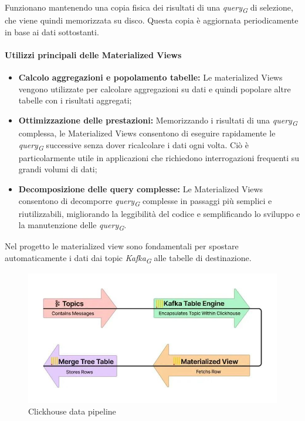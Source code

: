 Funzionano mantenendo una copia fisica dei risultati di una \textit{query}\textsubscript{\textit{G}} di selezione, che viene quindi memorizzata su disco. Questa copia è aggiornata periodicamente in base ai dati sottostanti.

\paragraph{Utilizzi principali delle Materialized Views}
\begin{itemize}
    \item \textbf{Calcolo aggregazioni e popolamento tabelle:} Le materialized Views vengono utilizzate per calcolare aggregazioni su dati e quindi popolare altre tabelle con i risultati aggregati;
    \item \textbf{Ottimizzazione delle prestazioni:} Memorizzando i risultati di una \textit{query}\textsubscript{\textit{G}} complessa, le Materialized Views consentono di eseguire rapidamente le \textit{query}\textsubscript{\textit{G}} successive senza dover ricalcolare i dati ogni volta. Ciò è particolarmente utile in applicazioni che richiedono interrogazioni frequenti su grandi volumi di dati;
    \item \textbf{Decomposizione delle query complesse:} Le Materialized Views consentono di decomporre \textit{query}\textsubscript{\textit{G}} complesse in passaggi più semplici e riutilizzabili, migliorando la leggibilità del codice e semplificando lo sviluppo e la manutenzione delle \textit{query}\textsubscript{\textit{G}}.
\end{itemize}

Nel progetto le materialized view sono fondamentali per spostare automaticamente i dati dai topic \textit{Kafka}\textsubscript{\textit{G}} alle tabelle di destinazione.
\begin{figure}[H]
  \centering
  \includegraphics[width=1\textwidth]{../Images/SpecificaTecnica/enginePipeline.jpg}
  \caption{Clickhouse data pipeline}
  \label{fig:data_pipeline_clickhouse}
\end{figure}

